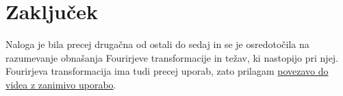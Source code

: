 \documentclass{article}
\begin{document}
\section{Zaključek}
Naloga je bila precej drugačna od ostali do sedaj in se je osredotočila na razumevanje obnašanja Fourirjeve transformacije in težav, ki nastopijo pri njej. Fourirjeva transformacija ima tudi precej uporab, zato prilagam \href{https://www.youtube.com/watch?v=GGPjQGOCbTY}{povezavo do videa z zanimivo uporabo}. 
\end{document}
